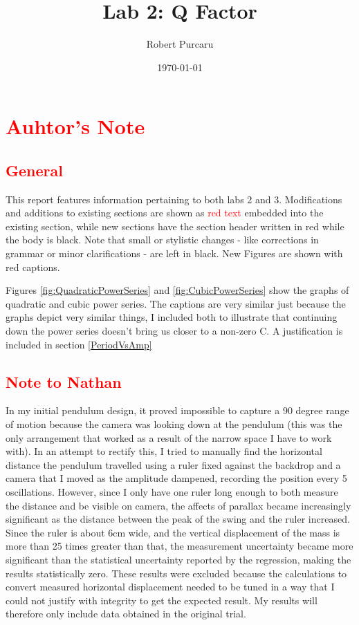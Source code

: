 \documentclass[11pt]{article}
\begin{document}
    \title{Lab 2: Q Factor}
        \author{Robert Purcaru}
        \date{\today}
    \maketitle

    \tableofcontents
    
    \section{\textcolor{red}{Auhtor's Note}}
        \subsection{\textcolor{red}{General}}This report features information pertaining to both labs 2 and 3. Modifications and additions to existing sections are shown as \textcolor{red}{red text} embedded into the existing section, while new sections have the section header written in red while the body is black. Note that small or stylistic changes - like corrections in grammar or minor clarifications - are left in black. New Figures are shown with red captions.

        Figures \ref{fig:QuadraticPowerSeries} and \ref{fig:CubicPowerSeries} show the graphs of quadratic and cubic power series. The captions are very similar just because the graphs depict very similar things, I included both to illustrate that continuing down the power series doesn't bring us closer to a non-zero C. A justification is included in section \ref{PeriodVsAmp}

        \subsection{\textcolor{red}{Note to Nathan}}\label{note}
        In my initial pendulum design, it proved impossible to capture a 90 degree range of motion because the camera was looking down at the pendulum (this was the only arrangement that worked as a result of the narrow space I have to work with). In an attempt to rectify this, I tried to manually find the horizontal distance the pendulum travelled using a ruler fixed against the backdrop and a camera that I moved as the amplitude dampened, recording the position every 5 oscillations. However, since I only have one ruler long enough to both measure the distance and be visible on camera, the affects of parallax became increasingly significant as the distance between the peak of the swing and the ruler increased. Since the ruler is about 6cm wide, and the vertical displacement of the mass is more than 25 times greater than that, the measurement uncertainty became more significant than the statistical uncertainty reported by the regression, making the results statistically zero. These results were excluded because the calculations to convert measured horizontal displacement needed to be tuned in a way that I could not justify with integrity to get the expected result.  My results will therefore only include data obtained in the original trial.
        
\end{document}
